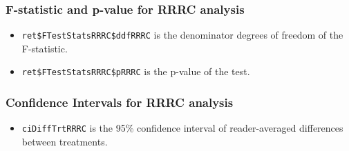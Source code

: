 \documentclass[
]{book}
\newenvironment{Shaded}{\begin{snugshade}}{\end{snugshade}}
\newcommand{\CommentTok}[1]{\textcolor[rgb]{0.56,0.35,0.01}{\textit{#1}}}
\newcommand{\NormalTok}[1]{#1}
\newcommand{\OperatorTok}[1]{\textcolor[rgb]{0.81,0.36,0.00}{\textbf{#1}}}
\providecommand{\tightlist}{%
  \setlength{\itemsep}{0pt}\setlength{\parskip}{0pt}}
\begin{document}
\begin{Shaded}
\end{Shaded}

\hypertarget{f-statistic-and-p-value-for-rrrc-analysis}{%
\subsubsection{F-statistic and p-value for RRRC analysis}\label{f-statistic-and-p-value-for-rrrc-analysis}}

\begin{itemize}
\tightlist
\item
  \texttt{ret\$FTestStatsRRRC\$ddfRRRC} is the denominator degrees of freedom of the F-statistic.
\end{itemize}

\begin{Shaded}
\end{Shaded}

\begin{itemize}
\tightlist
\item
  \texttt{ret\$FTestStatsRRRC\$pRRRC} is the p-value of the test.
\end{itemize}

\begin{Shaded}
\end{Shaded}

\hypertarget{confidence-intervals-for-rrrc-analysis}{%
\subsubsection{Confidence Intervals for RRRC analysis}\label{confidence-intervals-for-rrrc-analysis}}

\begin{itemize}
\tightlist
\item
  \texttt{ciDiffTrtRRRC} is the 95\% confidence interval of reader-averaged differences between treatments.
\end{itemize}
\end{document}
